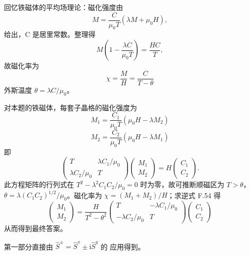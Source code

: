  回忆铁磁体的平均场理论：磁化强度由
\begin{equation*}
M = \frac{C}{\mu_0T}(\lambda M + \mu_0H),\tag{F.49}
\end{equation*}
给出，C 是居里常数。整理得
\begin{equation*}
M\left(1-\frac{\lambda C}{\mu_0T}\right) = \frac{HC}{T},\tag{F.50}
\end{equation*}
故磁化率为
\begin{equation*}
\chi = \frac{M}{H} = \frac{C}{T-\theta}\tag{F.51}
\end{equation*}
外斯温度 $\theta=\lambda C/\mu_0$。

对本题的铁磁体，每套子晶格的磁化强度为
\begin{equation*}
M_1 = \frac{C_1}{\mu_0T}(\mu_0H-\lambda M_2)\tag{F.52}
\end{equation*}
\begin{equation*}
M_2 = \frac{C_2}{\mu_0T}(\mu_0H-\lambda M_1)\tag{F.53}
\end{equation*}
即
\begin{equation*}
\begin{pmatrix} T & \lambda C_1/\mu_0\\ \lambda C_2/\mu_0 & T \end{pmatrix}\begin{pmatrix}M_1\\M_2\end{pmatrix} = H\begin{pmatrix}C_1\\C_2\end{pmatrix}.\tag{F.54}
\end{equation*}
此方程矩阵的行列式在 $T^{2}-\lambda^{2}C_1C_2/\mu_0=0$ 时为零，故可推断顺磁区为
$T>\theta$，$\theta=\lambda(C_1C_2)^{1/2}/\mu_0$。磁化率为
$\chi=(M_1+M_2)/H$；求逆式 F.54 得
\begin{equation*}
\begin{pmatrix}M_1\\M_2\end{pmatrix} = \frac{H}{T^{2}-\theta^{2}}\begin{pmatrix} T & -\lambda C_1/\mu_0\\ -\lambda C_2/\mu_0 & T \end{pmatrix}\begin{pmatrix}C_1\\C_2\end{pmatrix}\tag{F.55}
\end{equation*}
从而得到最终答案。

 第一部分直接由 $\hat{S}^{\pm}=\hat{S}^{x}\pm\mathrm{i}\hat{S}^{y}$ 的
应用得到。

